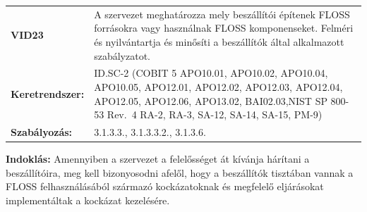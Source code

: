 \documentclass[12pt,magyar,a4paper,oneside]{scrreprt}
\begin{document}
\begin{longtable}[]{@{}ll@{}}
\toprule
\endhead
\begin{minipage}[t]{0.16\columnwidth}\raggedright
\textbf{VID23}\strut
\end{minipage} & \begin{minipage}[t]{0.79\columnwidth}\raggedright
A szervezet meghatározza mely beszállítói építenek FLOSS forrásokra vagy
használnak FLOSS komponenseket. Felméri és nyilvántartja és minősíti a
beszállítók által alkalmazott szabályzatot.\strut
\end{minipage}\tabularnewline
\begin{minipage}[t]{0.16\columnwidth}\raggedright
\textbf{Keretrendszer:}\strut
\end{minipage} & \begin{minipage}[t]{0.79\columnwidth}\raggedright
ID.SC-2 (COBIT 5 APO10.01, APO10.02, APO10.04, APO10.05, APO12.01,
APO12.02, APO12.03, APO12.04, APO12.05, APO12.06, APO13.02,
BAI02.03,NIST SP 800-53 Rev.~4 RA-2, RA-3, SA-12, SA-14, SA-15,
PM-9)\strut
\end{minipage}\tabularnewline
\begin{minipage}[t]{0.16\columnwidth}\raggedright
\textbf{Szabályozás:}\strut
\end{minipage} & \begin{minipage}[t]{0.79\columnwidth}\raggedright
3.1.3.3., 3.1.3.3.2., 3.1.3.6.\strut
\end{minipage}\tabularnewline
\bottomrule
\end{longtable}

\textbf{Indoklás: } Amennyiben a szervezet a felelősséget át kívánja
hárítani a beszállítóira, meg kell bizonyosodni afelől, hogy a
beszállítók tisztában vannak a FLOSS felhasználásából származó
kockázatoknak és megfelelő eljárásokat implementáltak a kockázat
kezelésére.
\end{document}
